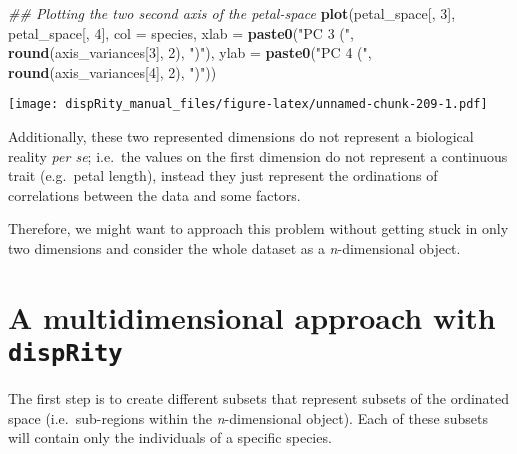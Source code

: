 \documentclass[
]{book}
\newenvironment{Shaded}{\begin{snugshade}}{\end{snugshade}}
\newcommand{\CommentTok}[1]{\textcolor[rgb]{0.56,0.35,0.01}{\textit{#1}}}
\newcommand{\DataTypeTok}[1]{\textcolor[rgb]{0.13,0.29,0.53}{#1}}
\newcommand{\DecValTok}[1]{\textcolor[rgb]{0.00,0.00,0.81}{#1}}
\newcommand{\KeywordTok}[1]{\textcolor[rgb]{0.13,0.29,0.53}{\textbf{#1}}}
\newcommand{\NormalTok}[1]{#1}
\newcommand{\StringTok}[1]{\textcolor[rgb]{0.31,0.60,0.02}{#1}}
\begin{document}
\begin{Shaded}
\begin{Highlighting}[]
\CommentTok{\#\# Plotting the two second axis of the petal{-}space}
\KeywordTok{plot}\NormalTok{(petal\_space[, }\DecValTok{3}\NormalTok{], petal\_space[, }\DecValTok{4}\NormalTok{], }\DataTypeTok{col =}\NormalTok{ species,}
    \DataTypeTok{xlab =} \KeywordTok{paste0}\NormalTok{(}\StringTok{"PC 3 ("}\NormalTok{, }\KeywordTok{round}\NormalTok{(axis\_variances[}\DecValTok{3}\NormalTok{], }\DecValTok{2}\NormalTok{), }\StringTok{")"}\NormalTok{),}
    \DataTypeTok{ylab =} \KeywordTok{paste0}\NormalTok{(}\StringTok{"PC 4 ("}\NormalTok{, }\KeywordTok{round}\NormalTok{(axis\_variances[}\DecValTok{4}\NormalTok{], }\DecValTok{2}\NormalTok{), }\StringTok{")"}\NormalTok{))}
\end{Highlighting}
\end{Shaded}

\texttt{[image: dispRity\_manual\_files/figure-latex/unnamed-chunk-209-1.pdf]}

Additionally, these two represented dimensions do not represent a biological reality \emph{per se}; i.e.~the values on the first dimension do not represent a continuous trait (e.g.~petal length), instead they just represent the ordinations of correlations between the data and some factors.

Therefore, we might want to approach this problem without getting stuck in only two dimensions and consider the whole dataset as a \emph{n}-dimensional object.

\hypertarget{a-multidimensional-approach-with-disprity}{%
\section{\texorpdfstring{A multidimensional approach with \texttt{dispRity}}{A multidimensional approach with dispRity}}\label{a-multidimensional-approach-with-disprity}}

The first step is to create different subsets that represent subsets of the ordinated space (i.e.~sub-regions within the \emph{n}-dimensional object).
Each of these subsets will contain only the individuals of a specific species.
\end{document}
